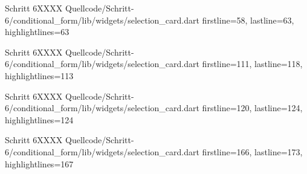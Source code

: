 \begin{alexlisting}{Schritt 6}{XXXX}
    {Quellcode/Schritt-6/conditional_form/lib/widgets/selection_card.dart}
    {firstline=58, lastline=63, highlightlines={63}}
    \label{lst:Schritt6XXXX}
\end{alexlisting}

\begin{alexlisting}{Schritt 6}{XXXX}
    {Quellcode/Schritt-6/conditional_form/lib/widgets/selection_card.dart}
    {firstline=111, lastline=118, highlightlines={113}}
    \label{lst:Schritt6XXXX}
\end{alexlisting}

\begin{alexlisting}{Schritt 6}{XXXX}
    {Quellcode/Schritt-6/conditional_form/lib/widgets/selection_card.dart}
    {firstline=120, lastline=124, highlightlines={124}}
    \label{lst:Schritt6XXXX}
\end{alexlisting}

\begin{alexlisting}{Schritt 6}{XXXX}
    {Quellcode/Schritt-6/conditional_form/lib/widgets/selection_card.dart}
    {firstline=166, lastline=173, highlightlines={167}}
    \label{lst:Schritt6XXXX}
\end{alexlisting}

\clearpage 
